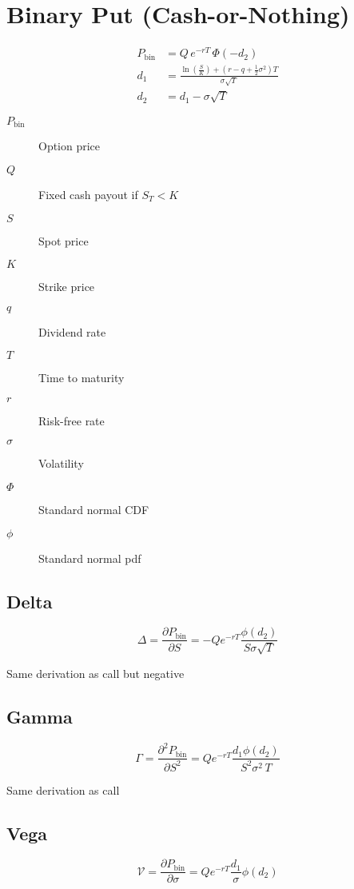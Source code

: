 \documentclass[12pt,a4paper]{article}
\begin{document}
\newpage

\section{Binary Put (Cash-or-Nothing)}

\[
  \begin{aligned}
    P_{\mathrm{bin}} & = Q \, e^{-rT} \,\Phi(-d_2) \\ 
    d_1 & = \frac{\ln\!\left(\tfrac{S}{K}\right) + (r - q + \tfrac{1}{2}\sigma^2)T}{\sigma \sqrt{T}} \\
    d_2 & = d_1 - \sigma \sqrt{T}
  \end{aligned}
\]

\begin{description}
  \item[$P_{\mathrm{bin}}$] Option price
  \item[$Q$] Fixed cash payout if \( S_T < K \)
  \item[$S$] Spot price
  \item[$K$] Strike price
  \item[$q$] Dividend rate
  \item[$T$] Time to maturity
  \item[$r$] Risk-free rate
  \item[$\sigma$] Volatility
  \item[$\Phi$] Standard normal CDF
  \item[$\phi$] Standard normal pdf
\end{description}

\subsection{Delta}
\[
  \boxed{\Delta = \frac{\partial P_{\mathrm{bin}}}{\partial S} = -Q e^{-rT} \frac{\phi(d_2)}{S\sigma\sqrt{T}}}
\]

Same derivation as call but negative
\subsection{Gamma}
\[
  \boxed{\Gamma = \frac{\partial^2 P_{\mathrm{bin}}}{\partial S^2} = Q e^{-rT}\frac{d_1\phi(d_2)}{S^2\sigma^2\,T}}
\]

Same derivation as call

\subsection{Vega}
\[
  \boxed{\mathcal{V} = \frac{\partial P_{\mathrm{bin}}}{\partial \sigma} = Qe^{-rT}\frac{d_1}{\sigma}\phi(d_2)}
\]
\end{document}
